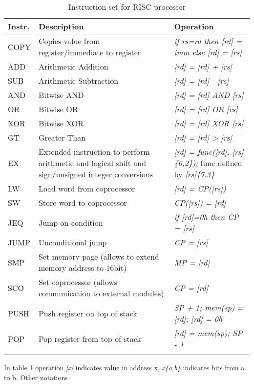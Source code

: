 \documentclass[a4paper,11pt]{article}
\begin{document}
\begin{table}[h!]
\centering
{}
\begin{tabular}{| l | p{10cm} | p{6.7cm} |} \hline 
	\rowcolor[rgb]{0.82,0.82,0.82}
	Instr. & Description & Operation \\\hline
	\arrayrulecolor[rgb]{0.82,0.82,0.82}
	COPY& Copies value from register/immediate to register & \textit{if rs=rd then [rd] = imm else [rd] = [rs]}  \\
\hline
	ADD & Arithmetic Addition & \textit{[rd] = [rd] + [rs]}  \\ \hline
	SUB & Arithmetic Subtraction & \textit{[rd] = [rd] - [rs]} \\ \hline
	AND & Bitwise AND & \textit{[rd] = [rd] AND [rs]} \\ \hline
	OR  & Bitwise OR & \textit{[rd] = [rd] OR [rs]} \\ \hline
	XOR & Bitwise XOR & \textit{[rd] = [rd] XOR [rs]} \\ \hline
	GT  & Greater Than & \textit{[rd] = [rd] > [rs]} \\ \hline
	EX  & Extended instruction to perform arithmetic and logical shift and sign/unsigned integer conversions & \textit{[rd] = func([rd], [rs]\{0,2\});} func defined by \textit{[rs]\{7,3\}} \\ \hline
	LW  & Load word from coprocessor & \textit{[rd] = CP([rs])} \\ \hline
	SW  & Store word to coprocessor & \textit{CP([rs]) = [rd]} \\ \hline
	JEQ & Jump on condition & \textit{if [rd]=0h then CP = [rs]} \\ \hline
	JUMP& Unconditional jump & \textit{CP = [rs]} \\ \hline
	SMP & Set memory page (allows to extend memory address to 16bit)& \textit{MP = [rd]} \\ \hline
	SCO & Set coprocessor (allows communication to external modules) & \textit{CP = [rd]} \\ \hline
	PUSH& Push register on top of stack & \textit{SP + 1; mem(sp) =[rd]; [rd] = 0h} \\ \hline
	POP & Pop register from top of stack & \textit{[rd] = mem(sp); SP - 1} \\ \arrayrulecolor{black}\hline


\end{tabular}
\caption{Instruction set for RISC processor}
\label{table:risc_instr}
\end{table}
In table \ref{table:risc_instr} operation \textit{[x]} indicates value in address x, \textit{x\{a,b\}} indicates bits from a to b. Other notations \\
\end{document}
